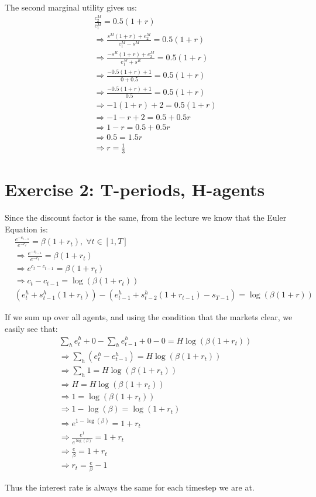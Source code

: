 \documentclass[11pt,a4paper]{article}
\begin{document}
The second marginal utility gives us:
\begin{align*}
&\frac{c_2^M}{c_1^M} = 0.5(1+r) \\
&\Rightarrow \frac{s^M(1+r) + e_2^M}{e_1^M - s^M} = 0.5(1+r) \\
&\Rightarrow \frac{-s^R(1+r) + e_2^M}{e_1^M + s^R} = 0.5(1+r) \\
&\Rightarrow \frac{-0.5(1+r) + 1}{0 + 0.5} = 0.5(1+r) \\
&\Rightarrow \frac{-0.5(1+r) + 1}{0.5} = 0.5(1+r) \\
&\Rightarrow -1(1+r) + 2 = 0.5(1+r) \\
&\Rightarrow -1 - r + 2 = 0.5 + 0.5r \\
&\Rightarrow 1 - r = 0.5 + 0.5r \\
&\Rightarrow 0.5 = 1.5r \\
&\Rightarrow r = \frac{1}{3}
\end{align*}

\section*{Exercise 2: T-periods, H-agents}
Since the discount factor is the same, from the lecture we know that the Euler Equation is:
\begin{align*}
&\frac{e^{-c_{t-1}}}{e^{-c_t}} = \beta(1+r_t), \; \forall t\in[1,T] \\
&\Rightarrow \frac{e^{-c_{t-1}}}{e^{-c_t}} = \beta(1+r_t) \\
&\Rightarrow e^{c_t - c_{t-1}} = \beta(1+r_t) \\
&\Rightarrow c_{t} - c_{t-1} = \log(\beta(1+r_t)) \\
&(e_t^h + s_{t-1}^h(1+r_t)) - (e_{t-1}^h + s_{t-2}^h(1+r_{t-1}) - s_{T-1}) = \log(\beta(1+r))
\end{align*}

If we sum up over all agents, and using the condition that the markets clear, we easily see that:
\begin{align*}
&\sum_h e_t^h + 0 - \sum_h e_{t-1}^h + 0 - 0 = H \log(\beta(1+r_t)) \\
&\Rightarrow \sum_h (e_t^h - e_{t-1}^h) = H \log(\beta(1+r_t)) \\
&\Rightarrow \sum_h 1 = H \log(\beta(1+r_t)) \\
&\Rightarrow H = H \log(\beta(1+r_t)) \\
&\Rightarrow 1 = \log(\beta(1+r_t)) \\
&\Rightarrow 1 - \log(\beta) = \log(1+r_t) \\
&\Rightarrow e^{1 - \log(\beta)} = 1+r_t \\
&\Rightarrow \frac{e^1}{e^{\log(\beta)}} = 1+r_t \\
&\Rightarrow \frac{e}{\beta} = 1+r_t \\
&\Rightarrow r_t = \frac{e}{\beta} - 1
\end{align*}

Thus the interest rate is always the same for each timestep we are at.
\end{document}
